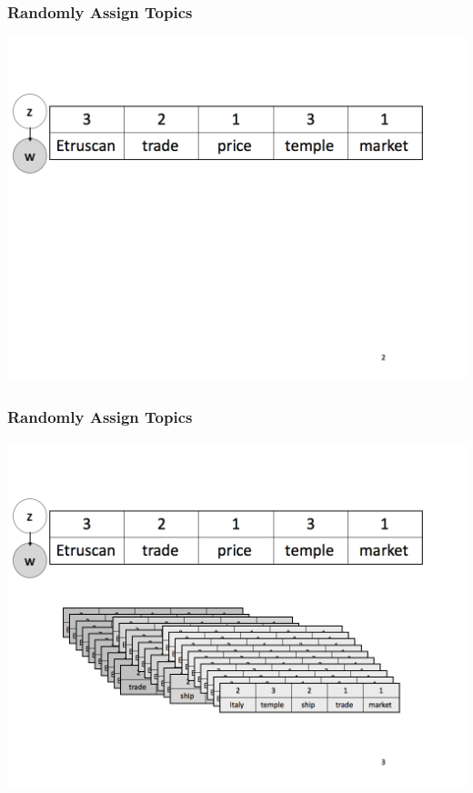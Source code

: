 \begin{frame}
  \frametitle{Randomly Assign Topics}
    \includegraphics[width=\linewidth]{topic_models/mimno_002}
\end{frame}

\begin{frame}
  \frametitle{Randomly Assign Topics}
    \includegraphics[width=\linewidth]{topic_models/mimno_003}
\end{frame}

